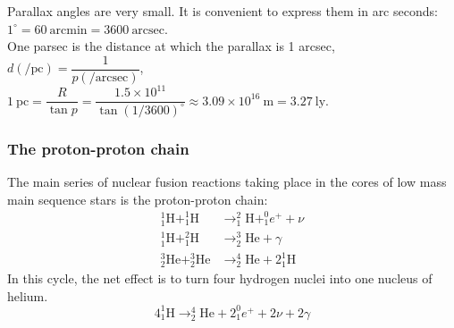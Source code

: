 \begin{center}
\end{center}
Parallax angles are very small. It is convenient to express them in arc seconds: $1^\circ=60\ \text{arcmin}=3600\ \text{arcsec}$.\\
One parsec is the distance at which the parallax is 1 arcsec, $d(/\text{pc})=\dfrac{1}{p(/\text{arcsec})}$, $1\ \text{pc}=\dfrac{R}{\tan p}=\dfrac{1.5\times 10^{11}}{\tan (1/3600)^\circ}\approx3.09\times 10^{16}\ \text{m} = 3.27\ \text{ly}$.
\subsubsection*{The proton-proton chain}
The main series of nuclear fusion reactions taking place in the cores of low mass main sequence stars is the proton-proton chain:
\[
\begin{aligned}
  ^1_1\text{H}+^1_1\text{H}&\rightarrow ^2_1\text{H}+^0_1e^++\nu\\
  ^1_1\text{H}+^2_1\text{H}&\rightarrow ^3_2\text{He}+\gamma\\
  ^3_2\text{He}+^3_2\text{He}&\rightarrow ^4_2\text{He}+2^1_1\text{H}
\end{aligned}\]
In this cycle, the net effect is to turn four hydrogen nuclei into one nucleus of helium. 
\[4^1_1\text{H}\rightarrow ^4_2\text{He}+2^0_1e^++2\nu +2\gamma\]
